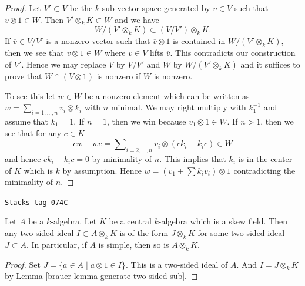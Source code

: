 \begin{proof}
Let $V' \subset V$ be the $k$-sub vector space generated by $v \in V$
such that $v \otimes 1 \in W$. Then $V' \otimes_k K \subset W$ and
we have
$$
W/(V' \otimes_k K)  \subset  (V/V') \otimes_k K.
$$
If $\overline{v} \in V/V'$ is a nonzero vector such that
$\overline{v} \otimes 1$ is contained in $W/(V' \otimes_k K)$,
then we see that $v \otimes 1 \in W$ where $v \in V$ lifts $\overline{v}$.
This contradicts our construction of $V'$. Hence we may replace
$V$ by $V/V'$ and $W$ by $W/(V' \otimes_k K)$ and it suffices to prove
that $W \cap (V \otimes 1)$ is nonzero if $W$ is nonzero.

\medskip\noindent
To see this let $w \in W$ be a nonzero element which can be written
as $w = \sum_{i = 1, \ldots, n} v_i \otimes k_i$ with $n$ minimal.
We may right multiply with $k_1^{-1}$ and assume that $k_1 = 1$.
If $n = 1$, then we win because $v_1 \otimes 1 \in W$.
If $n > 1$, then we see that for any $c \in K$
$$
c w - w c = \sum\nolimits_{i = 2, \ldots, n} v_i \otimes (c k_i - k_i c) \in W
$$
and hence $c k_i - k_i c = 0$ by minimality of $n$.
This implies that $k_i$ is in the center of $K$ which is $k$ by
assumption. Hence $w = (v_1 + \sum k_i v_i) \otimes 1$ contradicting
the minimality of $n$.
\end{proof}

\begin{lemma}
\label{brauer-lemma-generate-two-sided-ideal}
\href{https://stacks.math.columbia.edu/tag/074C}{\texttt{Stacks tag 074C}}

Let $A$ be a $k$-algebra. Let $K$ be a central $k$-algebra
which is a skew field. Then any two-sided ideal $I \subset A \otimes_k K$
is of the form $J \otimes_k K$ for some two-sided ideal $J \subset A$.
In particular, if $A$ is simple, then so is $A \otimes_k K$.
\end{lemma}

\begin{proof}

Set $J = \{a \in A \mid a \otimes 1 \in I\}$. This is a two-sided ideal
of $A$. And $I = J \otimes_k K$ by
Lemma \ref{brauer-lemma-generate-two-sided-sub}.
\end{proof}

